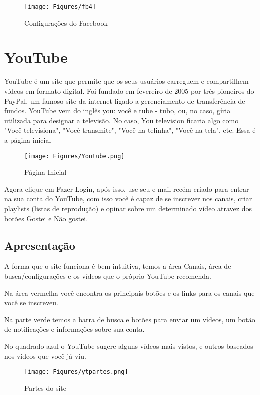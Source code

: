 \documentclass[hidelinks,12pt]{article}
\begin{document}
		\begin{figure}[!h]
			\centering
			\texttt{[image: Figures/fb4]}
			\label{fig:config}
			\caption{Configurações do Facebook}
		\end{figure}
	
	\newpage
	
	\section{YouTube}
	YouTube é um site que permite que os seus usuários carreguem e compartilhem vídeos em formato digital. Foi fundado em fevereiro de 2005 por três pioneiros do PayPal, um famoso site da internet ligado a gerenciamento de transferência de fundos. YouTube vem do inglês you: você e tube - tubo, ou, no caso, gíria utilizada para designar a televisão. No caso, You television ficaria algo como "Você televisiona", "Você transmite", "Você na telinha", "Você na tela", etc. Essa é a página inicial
	
	\begin{figure}[!h]
		\centering
		\texttt{[image: Figures/Youtube.png]}
		\label{fig:config}
		\caption{Página Inicial}
	\end{figure}
	
	
	Agora clique em Fazer Login, após isso, use seu e-mail recém criado para entrar na sua conta do YouTube, com isso você é capaz de se inscrever nos canais, criar playlists (listas de reprodução) e opinar sobre um determinado vídeo atravez dos botões Gostei e Não gostei.
	
	\newpage
	\subsection{Apresentação}
	A forma que o site funciona é bem intuitiva, temos a área Canais, área de busca/configurações e os vídeos que o próprio YouTube recomenda.
	
	Na área vermelha você encontra os principais botões e os links para os canais que você se inscreveu.
	
	Na parte verde temos a barra de busca e botões para enviar um vídeos, um botão de notificações e informações sobre sua conta.
	
	No quadrado azul o YouTube sugere alguns vídeos mais vistos, e outros baseados nos vídeos que você já viu.
	
	\begin{figure}[!h]
		\centering
		\texttt{[image: Figures/ytpartes.png]}
		\label{fig:config}
		\caption{Partes do site}
	\end{figure}
\end{document}
